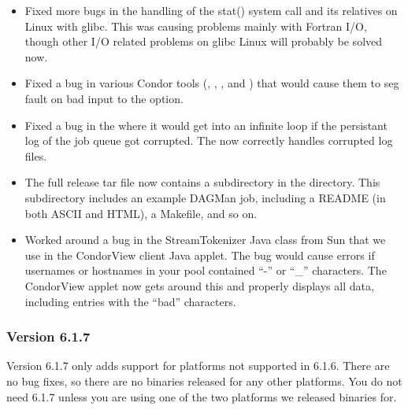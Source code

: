 \begin{itemize}

\item Fixed more bugs in the handling of the stat() system call
and its relatives on Linux with glibc.
This was causing problems mainly with Fortran I/O, though other I/O
related problems on glibc Linux will probably be solved now.

\item Fixed a bug in various Condor tools (,
, , and ) that
would cause them to seg fault on bad input to the  option. 

\item Fixed a bug in the  where it would get into an
infinite loop if the persistant log of the job queue got corrupted.  
The  now correctly handles corrupted log files.

\item The full release tar file now contains a 
subdirectory in the  directory.
This subdirectory includes an example DAGMan job, including a README
(in both ASCII and HTML), a Makefile, and so on.

\item Worked around a bug in the StreamTokenizer Java class from Sun
that we use in the CondorView client Java applet.
The bug would cause errors if usernames or hostnames in your pool
contained ``-'' or ``\_'' characters.
The CondorView applet now gets around this and properly displays all
data, including entries with the ``bad'' characters.

\end{itemize}

\subsubsection{\label{sec:New-6-1-7}Version 6.1.7}

\Note Version 6.1.7 only adds support for platforms not supported in
6.1.6.  
There are no bug fixes, so there are no binaries released for any
other platforms. 
You do not need 6.1.7 unless you are using one of the two platforms we
released binaries for.

